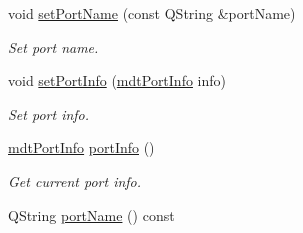 \begin{DoxyCompactItemize}
void \hyperlink{classmdt_port_manager_a2b2ed690cbba9f544c6ac1b46684e59a}{setPortName} (const QString \&portName)
\begin{DoxyCompactList}\small\item\em Set port name. \end{DoxyCompactList}\item 
void \hyperlink{classmdt_port_manager_a7e2ef93ec2731e66aa2b2d5f7ce9bc1c}{setPortInfo} (\hyperlink{classmdt_port_info}{mdtPortInfo} info)
\begin{DoxyCompactList}\small\item\em Set port info. \end{DoxyCompactList}\item 
\hypertarget{classmdt_port_manager_a88109b455fc5a5f5adf0636f7450143e}{
\hyperlink{classmdt_port_info}{mdtPortInfo} \hyperlink{classmdt_port_manager_a88109b455fc5a5f5adf0636f7450143e}{portInfo} ()}
\label{classmdt_port_manager_a88109b455fc5a5f5adf0636f7450143e}

\begin{DoxyCompactList}\small\item\em Get current port info. \end{DoxyCompactList}\item 
\hypertarget{classmdt_port_manager_af4fcab6aaad98d74aeabfc972da1d406}{
QString \hyperlink{classmdt_port_manager_af4fcab6aaad98d74aeabfc972da1d406}{portName} () const }
\label{classmdt_port_manager_af4fcab6aaad98d74aeabfc972da1d406}


\end{DoxyCompactItemize}
